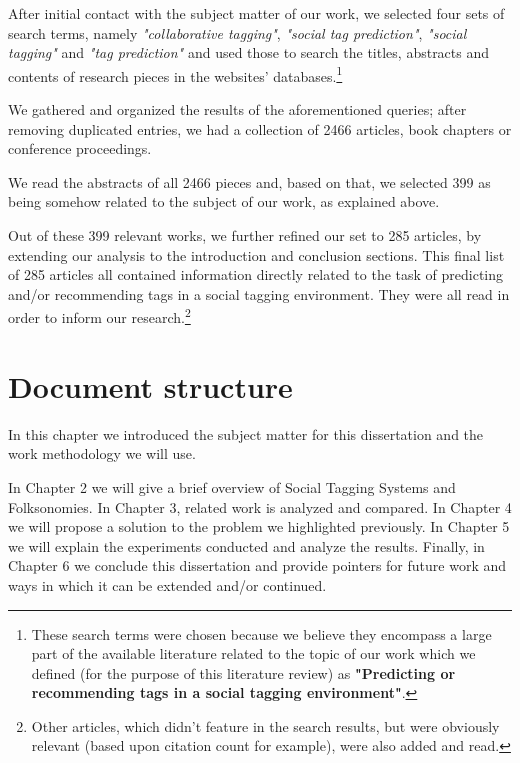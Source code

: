 After initial contact with the subject matter of our work, we selected four sets of search terms, namely \textit{"collaborative tagging"}, \textit{"social tag prediction"}, \textit{"social tagging"} and \textit{"tag prediction"} and used those to search the titles, abstracts and contents of research pieces in the websites' databases.\footnote{These search terms were chosen because we believe they encompass a large part  of the available literature related to the topic of our work which we defined (for the purpose of this literature review) as \textbf{"Predicting or recommending tags in a social tagging environment"}.} 

We gathered and organized the results of the aforementioned queries; after removing duplicated entries, we had a collection of 2466 articles, book chapters or conference proceedings.

We read the abstracts of all 2466 pieces and, based on that, we selected 399 as being somehow related to the subject of our work, as explained above.

Out of these 399 relevant works, we further refined our set to 285 articles, by extending our analysis to the introduction and conclusion sections. This final list of 285 articles all contained information directly related to the task of predicting and/or recommending tags in a social tagging environment. They were all read in order to inform our research.\footnote{Other articles, which didn't feature in the search results, but were obviously relevant (based upon citation count for example), were also added and read.}


\section{Document structure}\label{section:intro_structure}

In this chapter we introduced the subject matter for this dissertation and the work methodology we will use.

In Chapter 2 we will give a brief overview of Social Tagging Systems and Folksonomies. In Chapter 3, related work is analyzed and compared. In Chapter 4 we will propose a solution to the problem we highlighted previously. In Chapter 5 we will explain the experiments conducted and analyze the results. Finally, in Chapter 6 we conclude this dissertation and provide pointers for future work and ways in which it can be extended and/or continued.



